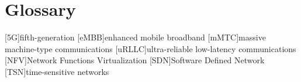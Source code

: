 \chapter{Glossary}

\footnotesize
\SingleSpacing

\begin{multicols}{2}
\begin{acronym}[AAAAAA]

	[5G]{fifth-generation}
	[eMBB]{enhanced mobile broadband}
	[mMTC]{massive machine-type communications}
	[uRLLC]{ultra-reliable low-latency communications}
	[NFV]{Network Functions Virtualization}
	[SDN]{Software Defined Network}
	[TSN]{time-sensitive networks}

\end{acronym}
\end{multicols}

